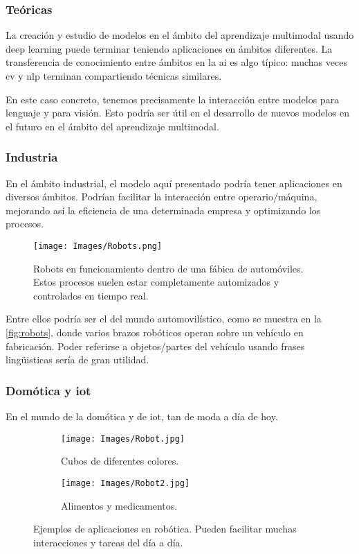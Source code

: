 \subsubsection{Teóricas}
La creación y estudio de modelos en el ámbito del aprendizaje multimodal usando
deep learning puede terminar teniendo aplicaciones en ámbitos diferentes. La
transferencia de conocimiento entre ámbitos en la \gls{ai} es algo típico:
muchas veces \gls{cv} y \gls{nlp} terminan compartiendo técnicas similares.

En este caso concreto, tenemos precisamente la interacción entre modelos para
lenguaje y para visión. Esto podría ser útil en el desarrollo de nuevos modelos
en el futuro en el ámbito del aprendizaje multimodal.

\subsubsection{Industria}
En el ámbito industrial, el modelo aquí presentado podría tener aplicaciones en
diversos ámbitos. Podrían facilitar la interacción entre operario/máquina,
mejorando así la eficiencia de una determinada empresa y optimizando los
procesos.

\begin{figure}[ht]
  \centering
  \texttt{[image: Images/Robots.png]}
  \caption[Robots en fábrica de automóviles]{Robots en funcionamiento dentro de
  una fábica de automóviles. Estos procesos suelen estar completamente
  automizados y controlados en tiempo real.}
  \label{fig:robots}
\end{figure}

Entre ellos podría ser el del mundo automovilístico, como se
muestra en la \vref{fig:robots}, donde varios brazos robóticos operan sobre un
vehículo en fabricación. Poder referirse a objetos/partes del vehículo usando
frases lingüisticas sería de gran utilidad.

\subsubsection{Domótica y \acs*{iot}}
En el mundo de la domótica y de \gls{iot}, tan de moda a día de hoy.

\begin{figure}[ht]
  \centering
  \begin{subfigure}[b]{.55\textwidth}
    \centering
    \texttt{[image: Images/Robot.jpg]}
    \caption{Cubos de diferentes colores.}
  \end{subfigure}\hfill
  \begin{subfigure}[b]{.4\textwidth}
    \centering
    \texttt{[image: Images/Robot2.jpg]}
    \caption{Alimentos y medicamentos.}
  \end{subfigure}
  \caption[Ejemplos de aplicaciones en robótica]{Ejemplos de aplicaciones en
    robótica. Pueden facilitar muchas interacciones y tareas del día a día.}
  \label{fig:robot}
\end{figure}

